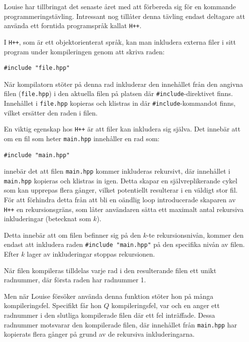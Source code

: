 
\noindent
Louise har tillbringat det senaste året med att förbereda sig för en kommande programmeringstävling. 
Intressant nog tillåter denna tävling endast deltagare att använda ett forntida programspråk kallat \verb|H++|.

I \verb|H++|, som är ett objektorienterat språk, kan man inkludera externa filer i sitt program under kompileringen
genom att skriva raden:

\begin{verbatim}
#include "file.hpp"
\end{verbatim}

När kompilatorn stöter på denna rad inkluderar den innehållet från den angivna filen (\texttt{file.hpp}) i den
aktuella filen på platsen där \verb|#include|-direktivet finns. Innehållet i \texttt{file.hpp} kopieras och
klistras in där \verb|#include|-kommandot finns, vilket ersätter den raden i filen.

En viktig egenskap hos \verb|H++| är att filer kan inkludera sig själva. Det innebär att om en fil som heter
\texttt{main.hpp} innehåller en rad som:

\begin{verbatim}
#include "main.hpp"
\end{verbatim}

innebär det att filen \texttt{main.hpp} kommer inkluderas rekursivt, där innehållet i \texttt{main.hpp} kopieras
och klistras in igen. Detta skapar en självreplikerande cykel som kan upprepas flera gånger, vilket potentiellt
resulterar i en väldigt stor fil. För att förhindra detta från att bli en oändlig loop introducerade skaparen av
\verb|H++| en rekursionsgräns, som låter användaren sätta ett maximalt antal rekursiva inkluderingar
(betecknat som $k$).

Detta innebär att om filen befinner sig på den $k$-te rekursionsnivån, 
kommer den endast att inkludera raden \verb|#include "main.hpp"| på den specifika nivån av filen. 
Efter $k$ lager av inkluderingar stoppas rekursionen.

När filen kompileras tilldelas varje rad i den resulterande filen ett unikt radnummer,
där första raden har radnummer 1.

Men när Louise försöker använda denna funktion stöter hon på många kompileringsfel. 
Specifikt får hon $Q$ kompileringsfel, var och en anger ett radnummer i den slutliga kompilerade filen där ett
fel inträffade. Dessa radnummer motsvarar den kompilerade filen, där innehållet från \texttt{main.hpp} har kopierats
flera gånger på grund av de rekursiva inkluderingarna.

